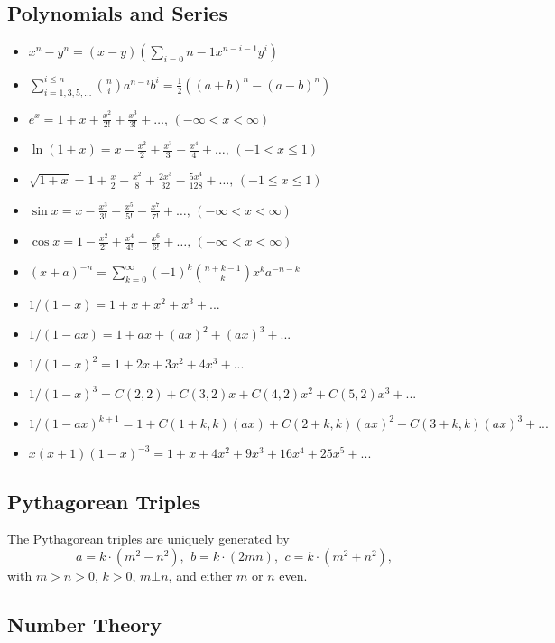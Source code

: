 {\subsection{Polynomials and Series}
\begin{itemize}[leftmargin=*, noitemsep]
  \item $x^n - y^n = (x - y) (\sum_{i=0}{n-1} x^{n - i - 1}y^{i})$
  \item $\sum_{i=1,3,5,\dots}^{i \leq n} \binom{n}{i} a^{n-i} b^i = \frac{1}{2} \left( (a+b)^n - (a-b)^n \right)$
  \item $e^x = 1+x+\frac{x^2}{2!}+\frac{x^3}{3!}+\dots,\,(-\infty<x<\infty)$
  \item $\ln(1+x) = x-\frac{x^2}{2}+\frac{x^3}{3}-\frac{x^4}{4}+\dots,\,(-1<x\leq1)$
  \item $\sqrt{1+x} = 1+\frac{x}{2}-\frac{x^2}{8}+\frac{2x^3}{32}-\frac{5x^4}{128}+\dots,\,(-1\leq x\leq1)$
  \item $\sin x = x-\frac{x^3}{3!}+\frac{x^5}{5!}-\frac{x^7}{7!}+\dots,\,(-\infty<x<\infty)$
  \item $\cos x = 1-\frac{x^2}{2!}+\frac{x^4}{4!}-\frac{x^6}{6!}+\dots,\,(-\infty<x<\infty)$
  \item $(x + a)^{-n} = \sum\limits_{k=0}^{\infty} (-1)^{k} { {n + k - 1}\choose{k}} x^{k}a^{-n-k}$
  \item $ 1/(1 - x) = 1 + x + x^2 + x^3 + ... $
  \item $ 1/(1 - ax) = 1 + ax + (ax)^2 + (ax)^3 + ... $
  \item $ 1/(1 - x)^2 = 1 + 2x + 3x^2 + 4x^3 + ... $
  \item $ 1/(1 - x)^3 = C(2, 2) + C(3, 2)x + C(4, 2)x^2 + C(5, 2)x^3 + ... $
  \item $ 1/(1 - ax)^{k + 1} = 1 + C(1 + k, k)(ax) + C(2 + k, k)(ax)^2 + C(3 + k, k)(ax)^3 + ... $
  \item $ x(x + 1)(1 - x)^{-3} = 1 + x + 4x^2 + 9x^3 + 16x^4 + 25x^5 + ... $
\end{itemize}

\subsection{Pythagorean Triples}
 The Pythagorean triples are uniquely generated by
 \[ a=k\cdot (m^{2}-n^{2}),\ \,b=k\cdot (2mn),\ \,c=k\cdot (m^{2}+n^{2}), \]
 with $m > n > 0$, $k > 0$, $m \bot n$, and either $m$ or $n$ even.


\subsection{Number Theory}

}
